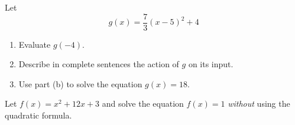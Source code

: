 \documentclass{ximera}
\begin{document}
\begin{question} \label{Qffee}
Let 
\[
       g(x) = \frac{7}{3}\left(x-5\right)^2 +4
\]

\begin{enumerate}
\item Evaluate $g(-4)$.

\item Describe in complete sentences the action of $g$ on its input.

\item Use part (b) to solve the equation $g(x) = 18$.

\end{enumerate}
\end{question}

\begin{question} \label{Qdf3efr30}
Let $f(x) = x^2 + 12x + 3$ and solve the equation $f(x)=1$ \emph{without} using the quadratic formula.
\end{question}
\end{document}
